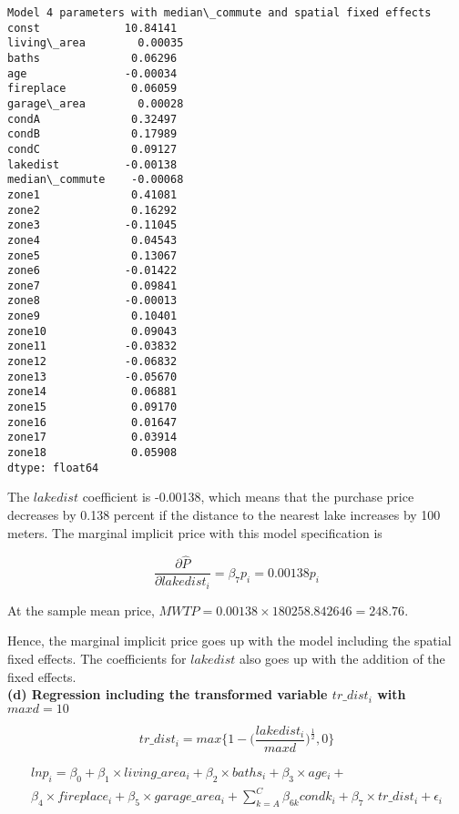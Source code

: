 \documentclass[11pt]{article}
\begin{document}
    \begin{Verbatim}[commandchars=\\\{\}]
Model 4 parameters with median\_commute and spatial fixed effects
const             10.84141
living\_area        0.00035
baths              0.06296
age               -0.00034
fireplace          0.06059
garage\_area        0.00028
condA              0.32497
condB              0.17989
condC              0.09127
lakedist          -0.00138
median\_commute    -0.00068
zone1              0.41081
zone2              0.16292
zone3             -0.11045
zone4              0.04543
zone5              0.13067
zone6             -0.01422
zone7              0.09841
zone8             -0.00013
zone9              0.10401
zone10             0.09043
zone11            -0.03832
zone12            -0.06832
zone13            -0.05670
zone14             0.06881
zone15             0.09170
zone16             0.01647
zone17             0.03914
zone18             0.05908
dtype: float64

    \end{Verbatim}

    The \(lakedist\) coefficient is -0.00138, which means that the purchase
price decreases by 0.138 percent if the distance to the nearest lake
increases by 100 meters. The marginal implicit price with this model
specification is

\begin{equation}
\frac{\partial \widehat{P}}{\partial lakedist_i} = \beta_7 p_i = 0.00138 p_i
\end{equation}

 At the sample mean price,
\(MWTP = 0.00138 \times 180258.842646 = 248.76\).

    Hence, the marginal implicit price goes up with the model including the
spatial fixed effects. The coefficients for \(lakedist\) also goes up
with the addition of the fixed effects.\\

    \textbf{(d) Regression including the transformed variable \(tr\_dist_i\) with
\(maxd=10\)}

\begin{equation}
tr\_dist_i = max \bigg \{ 1 - \bigg ( \frac{lakedist_i}{maxd} \bigg ) ^{\frac{1}{2}} , 0 \bigg \}  
\end{equation}

\begin{multline*}
ln p_i = \beta_0 + \beta_1 \times living\_area_i + 
\beta_2 \times baths_i + \beta_3 \times age_i + \\
\beta_4 \times fireplace_i + \beta_5 \times garage\_area_i +
\sum_{k=A}^{C} \beta_{6k}condk_i + \beta_7 \times tr\_dist_i + \epsilon_i
\end{multline*}
\end{document}

